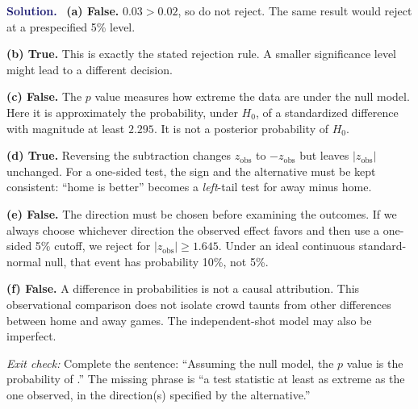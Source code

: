 \documentclass[11pt]{article}
\newenvironment{answer}{\par\medskip\noindent\textcolor{MidnightBlue}{\textbf{Solution.}}\ }{\par\medskip}
\begin{document}
\begin{answer}
\textbf{(a) False.} $0.03>0.02$, so do not reject. The same result would
reject at a prespecified 5\% level.

\textbf{(b) True.} This is exactly the stated rejection rule. A smaller
significance level might lead to a different decision.

\textbf{(c) False.} The $p$ value measures how extreme the data are under
the null model. Here it is approximately the probability, under $H_0$, of
a standardized difference with magnitude at least $2.295$. It is not a
posterior probability of $H_0$.

\textbf{(d) True.} Reversing the subtraction changes $z_{\mathrm{obs}}$
to $-z_{\mathrm{obs}}$ but leaves $|z_{\mathrm{obs}}|$ unchanged.
For a one-sided test, the sign and the alternative must be kept consistent:
``home is better'' becomes a \emph{left}-tail test for away minus home.

\textbf{(e) False.} The direction must be chosen before examining the
outcomes. If we always choose whichever direction the observed effect
favors and then use a one-sided 5\% cutoff, we reject for
$|z_{\mathrm{obs}}|\geq1.645$. Under an ideal continuous standard-normal
null, that event has probability 10\%, not 5\%.

\textbf{(f) False.} A difference in probabilities is not a causal
attribution. This observational comparison does not isolate crowd taunts
from other differences between home and away games. The independent-shot
model may also be imperfect.

\medskip
\noindent\textit{Exit check:} Complete the sentence: ``Assuming the null
model, the $p$ value is the probability of \underline{\hspace{3cm}}.''
The missing phrase is ``a test statistic at least as extreme as the one
observed, in the direction(s) specified by the alternative.''
\end{answer}

\newpage
\end{document}
